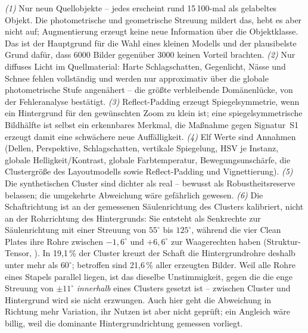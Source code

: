  \emph{(1)} Nur neun Quellobjekte -- jedes
erscheint rund 15\,100-mal als gelabeltes Objekt. Die photometrische und
geometrische Streuung mildert das, hebt es aber nicht auf; Augmentierung erzeugt
keine neue Information über die Objektklasse. Das ist der Hauptgrund für die
Wahl eines kleinen Modells und der plausibelste Grund dafür, dass 6000 Bilder
gegenüber 3000 keinen Vorteil brachten. \emph{(2)} Nur diffuses Licht im
Quellmaterial: Harte Schlagschatten, Gegenlicht, Nässe und Schnee fehlen
vollständig und werden nur approximativ über die globale photometrische Stufe
angenähert -- die größte verbleibende Domänenlücke, von der Fehleranalyse
bestätigt. \emph{(3)} Reflect-Padding erzeugt Spiegelsymmetrie, wenn ein
Hintergrund für den gewünschten Zoom zu klein ist; eine spiegelsymmetrische
Bildhälfte ist selbst ein erkennbares Merkmal, die Maßnahme gegen Signatur~S1
erzeugt damit eine schwächere neue Auffälligkeit. \emph{(4)} Elf Werte sind
Annahmen (Dellen, Perspektive, Schlagschatten, vertikale Spiegelung, HSV je
Instanz, globale Helligkeit/Kontrast, globale Farbtemperatur,
Bewegungsunschärfe, die Clustergröße des Layoutmodells sowie Reflect-Padding
und Vignettierung). \emph{(5)} Die synthetischen Cluster sind
dichter als real -- bewusst als Robustheitsreserve belassen; die umgekehrte
Abweichung wäre gefährlich gewesen. \emph{(6)} Die Schaftrichtung ist an der
gemessenen Säulenrichtung des Clusters kalibriert, nicht an der Rohrrichtung des
Hintergrunds: Sie entsteht als Senkrechte zur Säulenrichtung mit einer Streuung
von $55^\circ$ bis $125^\circ$, während die vier Clean Plates ihre Rohre
zwischen $-1{,}6^\circ$ und $+6{,}6^\circ$ zur Waagerechten haben
(Struktur-Tensor, ). In 19,1\,\% der Cluster kreuzt der
Schaft die Hintergrundrohre deshalb unter mehr als $60^\circ$; betroffen sind
21,6\,\% aller erzeugten Bilder. Weil alle Rohre eines Stapels parallel liegen,
ist das dieselbe Unstimmigkeit, gegen die die enge Streuung von $\pm11^\circ$
\emph{innerhalb} eines Clusters gesetzt ist -- zwischen Cluster und Hintergrund
wird sie nicht erzwungen. Auch hier geht die Abweichung in Richtung mehr
Variation, ihr Nutzen ist aber nicht geprüft; ein Angleich wäre billig, weil die
dominante Hintergrundrichtung gemessen vorliegt.

